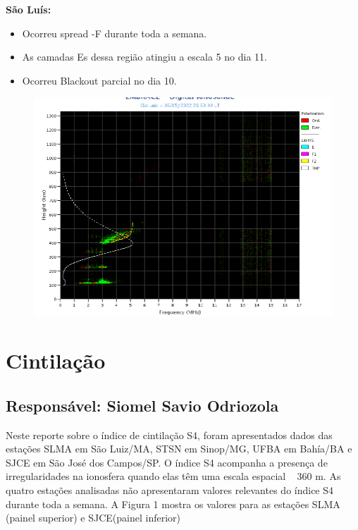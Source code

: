 \documentclass[a4paper, 10pt]{article}
\begin{document}
\textbf{São Luís: }

 \begin{itemize}
\item Ocorreu spread -F durante toda a semana. 
\item As camadas Es dessa região atingiu a escala 5 no dia 11. 
\item Ocorreu Blackout parcial no dia 10.
\end{itemize}
\begin{figure}[H]
    \centering
    \includegraphics[width=14cm]{./figures//SãoLuís.png}
\end{figure}

\section{Cintilação} 
 \subsection{Responsável: Siomel Savio Odriozola} 
 
Neste reporte sobre o índice de cintilação S4, foram apresentados dados das 
estações SLMA em São Luiz/MA, STSN em Sinop/MG, UFBA em Bahía/BA e 
SJCE em São José dos Campos/SP. O índice S4 acompanha a presença de 
irregularidades na ionosfera quando elas têm uma escala espacial ~ 360 m.  
As quatro estações analisadas não apresentaram valores relevantes do índice 
S4 durante toda a semana. A Figura 1 mostra os valores para as estações SLMA 
(painel superior) e SJCE(painel inferior) 
\end{document}
